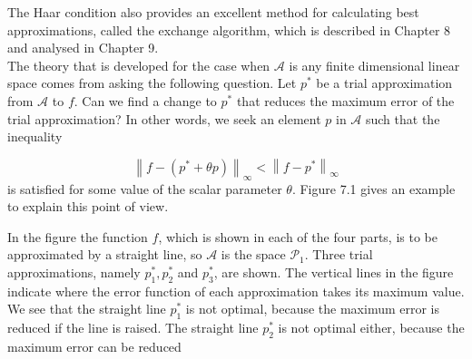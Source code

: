 \documentclass[11pt]{article}
\begin{document}
The Haar condition also provides an excellent method for calculating best approximations, called the exchange algorithm, which is described in Chapter 8 and analysed in Chapter 9.\\

The theory that is developed for the case when $\mathscr{A}$ is any finite dimensional linear space comes from asking the following question. Let $p^{*}$ be a trial approximation from $\mathscr{A}$ to $f$. Can we find a change to $p^{*}$ that reduces the maximum error of the trial approximation? In other words, we seek an element $p$ in $\mathscr{A}$ such that the inequality


\begin{equation}
\left\|f-\left(p^{*}+\theta p\right)\right\|_{\infty}<\left\|f-p^{*}\right\|_{\infty} 
\label{ineq:1}
\end{equation}
is satisfied for some value of the scalar parameter $\theta$. Figure 7.1 gives an example to explain this point of view.

In the figure the function $f$, which is shown in each of the four parts, is to be approximated by a straight line, so $\mathscr{A}$ is the space $\mathscr{P}_{1}$. Three trial approximations, namely $p_{1}^{*}, p_{2}^{*}$ and $p_{3}^{*}$, are shown. The vertical lines in the figure indicate where the error function of each approximation takes its maximum value. We see that the straight line $p_{1}^{*}$ is not optimal, because the maximum error is reduced if the line is raised. The straight line $p_{2}^{*}$ is not optimal either, because the maximum error can be reduced
\end{document}
